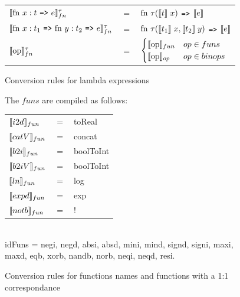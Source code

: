 \documentclass[11pt]{article}
\begin{document}
\begin{figure}
\begin{tabular}{l c l}
$\evals{ \text{fn } x:t $ {\tt =>} $ e}^{\tau}_{fn} $ & $=$ & $ \text{fn } \tau (\llbracket t \rrbracket\; x) $ {\tt =>} $ \llbracket e \rrbracket$\\
$\evals{ \text{fn } x:t_1$ {\tt =>} $\text{fn } y:t_2 $ {\tt =>} $ e}^{\tau}_{fn} $ & $=$ & $ \text{fn } \tau (\llbracket t_1 \rrbracket\; x, \llbracket t_2 \rrbracket \; y) $ {\tt =>} $ \llbracket e \rrbracket$\\
$\llbracket \text{op} \rrbracket^{\tau}_{fn}$ & = & $ \begin{cases} \llbracket \text{op} \rrbracket_{fun} & op \in funs \\ \llbracket \text{op} \rrbracket_{op} & op \in binops \end{cases}$
\end{tabular}
    \caption{Conversion rules for lambda expressions}
    \label{fig:lambdas}
\end{figure}


\begin{figure}
The $funs$ are compiled as follows:\\
\begin{tabular}{l c l}
$\llbracket i2d \rrbracket_{fun}$ & $=$ & toReal\\ 
$\llbracket catV \rrbracket_{fun}$ & $=$ & concat\\ 
$\llbracket b2i \rrbracket_{fun}$ & $=$ & boolToInt\\ 
$\llbracket b2iV \rrbracket_{fun}$ & $=$ & boolToInt\\ 
$\llbracket ln \rrbracket_{fun}$ & $=$ & log\\ 
$\llbracket expd \rrbracket_{fun}$ & $=$ & exp\\ 
$\llbracket notb \rrbracket_{fun}$ & $=$ & !\\ 
\end{tabular}\\


idFuns = negi, negd, absi, absd, mini, mind, signd, signi, maxi, maxd, eqb, xorb, nandb, norb, neqi, neqd, resi.
\caption{Conversion rules for functions names and functions with a 1:1 correspondance}
\label{fig:funs}
\end{figure}
\end{document}
